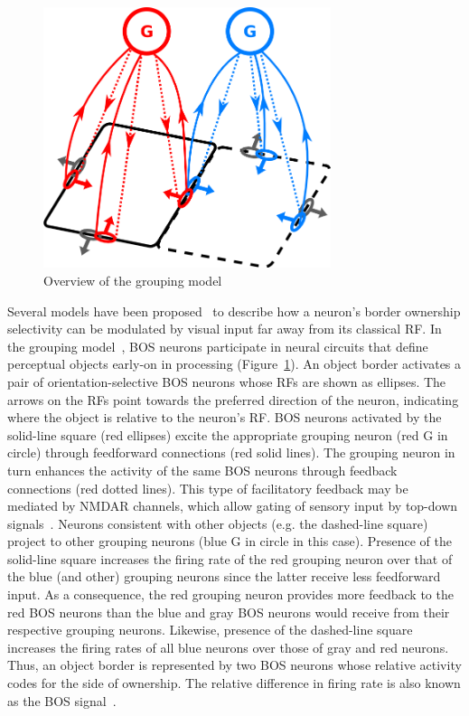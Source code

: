 \begin{figure}[t]
\centering
\includegraphics[width=0.75\textwidth]{Intro/figs/groupingcircuit}
\makeatletter
\let\@currsize\normalsize
\caption{Overview of the grouping model}
\label{fig:GroupingModel}
\end{figure}

Several models have been proposed~\citep{Zhaoping05, Sakai_Nishimura06,Craft_etal07, Layton_etal12} to describe how a neuron's border ownership selectivity can be modulated by visual input far away from its classical RF. In the grouping model~\citep{Craft_etal07}, BOS neurons participate in neural circuits that define perceptual objects early-on in processing (Figure~\ref{fig:GroupingModel}). An object border activates a pair of orientation-selective BOS neurons whose RFs are shown as ellipses. The arrows on the RFs point towards the preferred direction of the neuron, indicating where the object is relative to the neuron's RF. BOS neurons activated by the solid-line square (red ellipses) excite the appropriate grouping neuron (red G in circle) through feedforward connections (red solid lines). The grouping neuron in turn enhances the activity of the same BOS neurons through feedback connections (red dotted lines). This type of facilitatory feedback may be mediated by NMDAR channels, which allow gating of sensory input by top-down signals~\citep{Palmer_etal14,Wagatsuma_etal16a}. Neurons consistent with other objects (e.g. the dashed-line square) project to other grouping neurons (blue G in circle in this case). Presence of the solid-line square increases the firing rate of the red grouping neuron over that of the blue (and other) grouping neurons since the latter receive less feedforward input. As a consequence, the red grouping neuron provides more feedback to the red BOS neurons than the blue and gray BOS neurons would receive from their respective grouping neurons. Likewise, presence of the dashed-line square increases the firing rates of all blue neurons over those of gray and red neurons. Thus, an object border is represented by two BOS neurons whose relative activity codes for the side of ownership. The relative difference in firing rate is also known as the BOS signal~\citep{Zhou_etal00}.

